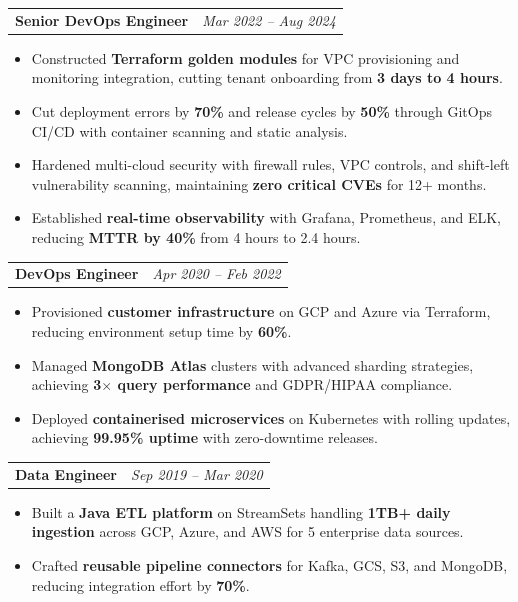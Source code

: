 \documentclass[10pt, letterpaper]{article}
\makeatletter
\newcommand{\job}[4]{%
  \vspace{4pt}%
  \noindent\begin{tabular*}{\textwidth}{@{}l@{\extracolsep{\fill}}r@{}}%
    \textbf{#1}\enspace{\color{mid}\small$|$\enspace#2,\ #3} &
    {\color{mid}\small\textit{#4}}%
  \end{tabular*}%
  \vspace{0pt}%
}
\makeatother
\begin{document}
\job{Senior DevOps Engineer}{Modak Analytics}{Hyderabad}{Mar 2022 -- Aug 2024}
\begin{itemize}
  \item Constructed \textbf{Terraform golden modules} for VPC provisioning and monitoring
    integration, cutting tenant onboarding from \textbf{3 days to 4 hours}.

  \item Cut deployment errors by \textbf{70\%} and release cycles by \textbf{50\%} through
    GitOps CI/CD with container scanning and static analysis.

  \item Hardened multi-cloud security with firewall rules, VPC controls, and shift-left
    vulnerability scanning, maintaining \textbf{zero critical CVEs} for 12+ months.

  \item Established \textbf{real-time observability} with Grafana, Prometheus, and ELK,
    reducing \textbf{MTTR by 40\%} from 4 hours to 2.4 hours.
\end{itemize}

\job{DevOps Engineer}{Modak Analytics}{Hyderabad}{Apr 2020 -- Feb 2022}
\begin{itemize}
  \item Provisioned \textbf{customer infrastructure} on GCP and Azure via Terraform,
    reducing environment setup time by \textbf{60\%}.

  \item Managed \textbf{MongoDB Atlas} clusters with advanced sharding strategies,
    achieving \textbf{3$\times$ query performance} and GDPR/HIPAA compliance.

  \item Deployed \textbf{containerised microservices} on Kubernetes with rolling updates,
    achieving \textbf{99.95\% uptime} with zero-downtime releases.
\end{itemize}

\job{Data Engineer}{Modak Analytics}{Hyderabad}{Sep 2019 -- Mar 2020}
\begin{itemize}
  \item Built a \textbf{Java ETL platform} on StreamSets handling \textbf{1TB+ daily ingestion}
    across GCP, Azure, and AWS for 5 enterprise data sources.

  \item Crafted \textbf{reusable pipeline connectors} for Kafka, GCS, S3, and MongoDB,
    reducing integration effort by \textbf{70\%}.
\end{itemize}
\end{document}
